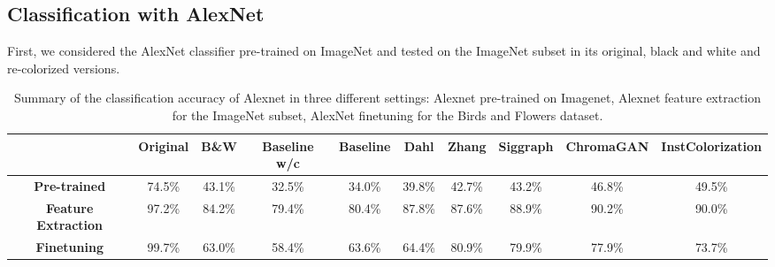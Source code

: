\subsection{Classification with AlexNet}
First, we considered the AlexNet classifier pre-trained on ImageNet and tested on the ImageNet subset in its original, black and white and re-colorized versions.

\begin{table}[ht]
	\begin{center}
		\begin{adjustwidth}{-1cm}{}
			\begin{tabular}{c|ccccccccc}
				&\textbf{Original} & \textbf{B\&W} & \textbf{Baseline w/c}&\textbf{Baseline} & \textbf{Dahl} & \textbf{Zhang} & \textbf{Siggraph} & \textbf{ChromaGAN} & \textbf{InstColorization}  \\
				\midrule
				\textbf{Pre-trained} & 74.5\% & 43.1\% & 32.5\% & 34.0\% & 39.8\% & 42.7\% & 43.2\% & 46.8\% & 49.5\% \\
				\midrule
				\textbf{Feature Extraction} & 97.2\% & 84.2\% & 79.4\% & 80.4\% & 87.8\% & 87.6\% &  88.9\%   &  90.2\% &       90.0\% \\
				\midrule
				\textbf{Finetuning} & 99.7\% & 63.0\% & 58.4\% & 63.6\% & 64.4\% & 80.9\% &  79.9\%   &  77.9\% &       73.7\% \\
			\end{tabular}
		\end{adjustwidth}
	\end{center}
	\caption{{\small  Summary of the classification accuracy of Alexnet in three different settings: Alexnet pre-trained on Imagenet, Alexnet feature extraction for the ImageNet subset, AlexNet finetuning for the Birds and Flowers dataset.}}
	\label{tab:pre-trained}
\end{table}

